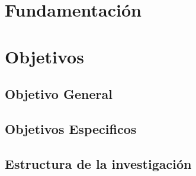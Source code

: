 \section{Fundamentación}
\section{Objetivos}
	\subsection{Objetivo General}
	\subsection{Objetivos  Especificos}
	\subsection{Estructura de la investigación}